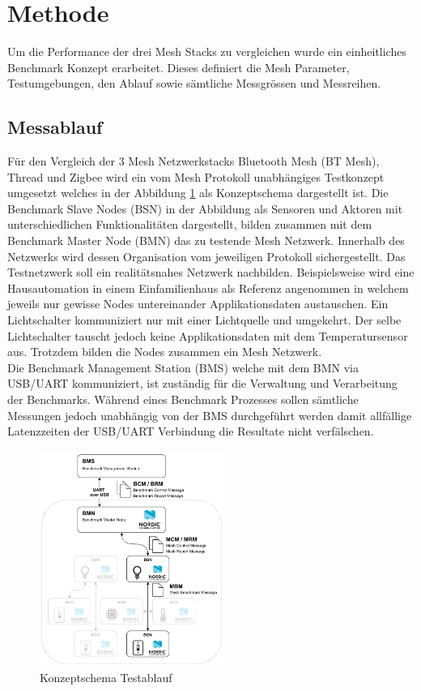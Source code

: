 \section{Methode}
Um die Performance der drei Mesh Stacks zu vergleichen wurde ein einheitliches Benchmark Konzept erarbeitet. Dieses definiert die Mesh Parameter, Testumgebungen, den Ablauf sowie sämtliche Messgrössen und Messreihen.

\subsection{Messablauf}
Für den Vergleich der 3 Mesh Netzwerkstacks Bluetooth Mesh (BT Mesh), Thread und Zigbee wird ein vom Mesh Protokoll unabhängiges Testkonzept umgesetzt welches in der Abbildung \ref{fig:KonzeptschemaTestablauf} als Konzeptschema dargestellt ist. Die Benchmark Slave Nodes (BSN) in der Abbildung als Sensoren und Aktoren mit unterschiedlichen Funktionalitäten dargestellt, bilden zusammen mit dem Benchmark Master Node (BMN) das zu testende Mesh Netzwerk. Innerhalb des Netzwerks wird dessen Organisation vom jeweiligen Protokoll sichergestellt. Das Testnetzwerk soll ein realitätsnahes Netzwerk nachbilden. Beispielsweise wird eine Hausautomation in einem Einfamilienhaus als Referenz angenommen in welchem jeweils nur gewisse Nodes untereinander Applikationsdaten austauschen. Ein Lichtschalter kommuniziert nur mit einer Lichtquelle und umgekehrt. Der selbe Lichtschalter tauscht jedoch keine Applikationsdaten mit dem Temperatursensor aus. Trotzdem bilden die Nodes zusammen ein Mesh Netzwerk.\\

Die Benchmark Management Station (BMS) welche mit dem BMN via USB/UART kommuniziert, ist zuständig für die Verwaltung und Verarbeitung der Benchmarks. Während eines Benchmark Prozesses sollen sämtliche Messungen jedoch unabhängig von der BMS durchgeführt werden damit allfällige Latenzzeiten der USB/UART Verbindung die Resultate nicht verfälschen.

\begin{figure}[h]
	\centering
	\includegraphics[width=6cm]{graphics/Mesh_Testkonzeptschema.png}
	\caption{Konzeptschema Testablauf}
	\label{fig:KonzeptschemaTestablauf}
\end{figure}


